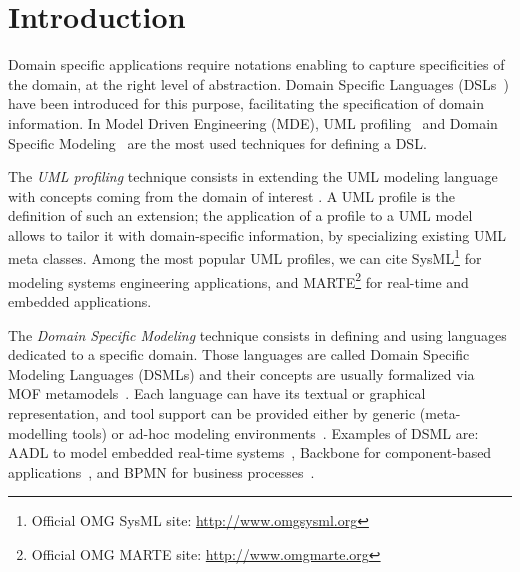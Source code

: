 \section{Introduction}\label{sec:intro}

Domain specific applications require notations enabling to capture specificities of the domain, at the right level of abstraction. Domain Specific Languages (DSLs~\cite{FowlerBook}) have been introduced for this purpose, facilitating the specification of domain information. In Model Driven Engineering (MDE), UML profiling~\cite{UML} and Domain Specific Modeling~\cite{DSML} are the most used techniques for defining a DSL.

The \textit{UML profiling} technique consists in extending the UML modeling language with concepts coming from
the domain of interest \cite{UMLprofile}.
A UML profile is the definition of such an extension; the application of a profile to a UML model allows to tailor it with domain-specific information, by specializing existing UML meta classes. Among the most popular UML profiles, we can cite SysML\footnote{Official OMG SysML site: \small{\url{http://www.omgsysml.org}}}
for modeling systems engineering applications, and
MARTE\footnote{Official OMG MARTE site: \small{\url{http://www.omgmarte.org}}} for real-time and embedded applications.

The \textit{Domain Specific Modeling} technique consists in defining and using languages dedicated to a specific domain.
Those languages are called Domain Specific Modeling Languages (DSMLs) and their concepts are usually formalized  via MOF metamodels~\cite{MOF}.
Each language can have its textual or graphical representation, and tool support can be provided either by generic (meta-modelling tools) or
ad-hoc modeling environments~\cite{DSML}.
Examples of DSML are: AADL to model embedded real-time systems~\cite{aadl}, Backbone for component-based applications~\cite{backbone},
and BPMN for business processes~\cite{BPMN}.

